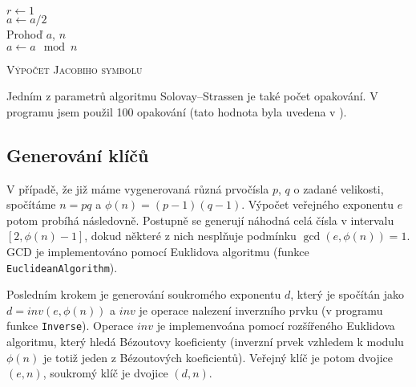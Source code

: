 \documentclass[a4paper,12pt]{article}
\begin{document}
\medskip
\begin{algorithm}[H]
 \SetNlSty{}{}{:}
 \SetNlSkip{-1.2em}
 \SetInd{1em}{1em}
 \BlankLine
 \Indentp{1.7em}
    $r \gets 1$ \\
     {
       {
	$a \gets a / 2$ \\
      }
      Prohoď $a$, $n$ \\
      $a \gets a \mod n$ \\
    }
 \caption{\textsc{Výpočet Jacobiho symbolu}}
 \label{fastSlam}
\end{algorithm}

Jedním z parametrů algoritmu Solovay--Strassen je také počet opakování. V programu jsem
použil 100 opakování (tato hodnota byla uvedena v \cite{nech}).

\subsection{Generování klíčů}
V případě, že již máme vygenerovaná různá prvočísla $p$, $q$ o zadané velikosti, 
spočítáme $n = pq$ a $\phi(n) = (p-1)(q - 1)$. Výpočet veřejného exponentu $e$
potom probíhá následovně. 
%
Postupně se generují náhodná celá čísla v intervalu $[2, \phi(n) - 1]$, dokud
některé z nich nesplňuje podmínku $\gcd(e,\phi(n)) = 1$. GCD je implementováno
pomocí Euklidova algoritmu (funkce \texttt{EuclideanAlgorithm}).

Posledním krokem je generování soukromého exponentu $d$, který je spočítán jako
$d = inv(e, \phi(n))$ a $inv$ je operace nalezení inverzního prvku (v programu funkce \texttt{Inverse}). Operace $inv$
je implemenvoána pomocí rozšířeného Euklidova algoritmu, který hledá Bézoutovy 
koeficienty (inverzní prvek vzhledem k modulu $\phi(n)$ je totiž jeden z Bézoutových 
koeficientů). Veřejný klíč je potom dvojice $(e, n)$, soukromý klíč je dvojice $(d,n)$.
\end{document}
